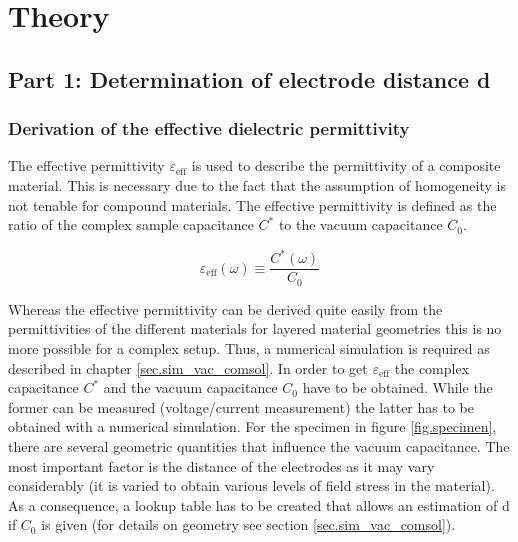 \chapter{Theory}
\section{Part 1: Determination of electrode distance d}

\subsection{Derivation of the effective dielectric permittivity}
\label{subsec.Derivationeffective}
The effective permittivity $\varepsilon_{\textrm{eff}}$  is used to describe the permittivity of a composite material. This is necessary due to the fact that the assumption of homogeneity is not tenable for compound materials. The effective permittivity is defined as the ratio of the complex sample capacitance  $C^*$ 
 to the vacuum capacitance $C_0$.

\begin{equation}
\varepsilon_{\textrm{eff}}(\omega) \equiv \frac{C^*(\omega)}{C_0} 
\end{equation}

Whereas the effective permittivity can be derived quite easily from the permittivities of the different materials for layered material geometries this is no more  possible for a complex setup. Thus, a numerical simulation is required as described in chapter \ref{sec.sim_vac_comsol}. In order to get $\varepsilon_{\textrm{eff}}$ the complex capacitance $C^*$ and the vacuum capacitance $C_0$ have to be obtained. While the former can be measured (voltage/current measurement) the latter has to be obtained with a numerical simulation. 
For the specimen in figure \ref{fig.specimen}, there are several geometric quantities that influence the vacuum capacitance. The most important factor is the distance of the electrodes as it may vary considerably (it is varied to obtain various levels of field stress in the material). As a consequence, a lookup table has to be created that allows an estimation of d if $C_0$ is given (for details on geometry see section \ref{sec.sim_vac_comsol}). 

 



